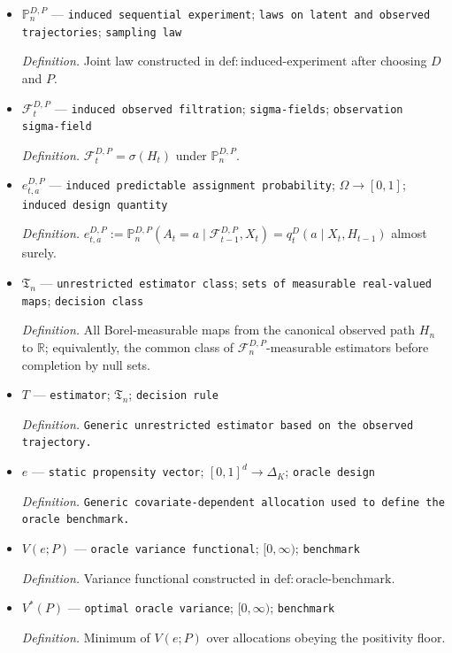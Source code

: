 \documentclass{article}
\begin{document}
\begin{itemize}
  \item \(\mathbb P_n^{D,P}\) --- \texttt{induced sequential experiment}; \texttt{laws on latent and observed trajectories}; \texttt{sampling law}
  \par\smallskip\noindent\emph{Definition.} Joint law constructed in \(\mathrm{def{:}induced\text{-}experiment}\) after choosing \(D\) and \(P\).
  \item \(\mathcal F_t^{D,P}\) --- \texttt{induced observed filtration}; \texttt{sigma-\allowbreak{}fields}; \texttt{observation sigma-\allowbreak{}field}
  \par\smallskip\noindent\emph{Definition.} \(\mathcal F_t^{D,P}=\sigma(H_t)\) under \(\mathbb P_n^{D,P}\).
  \item \(e_{t,a}^{D,P}\) --- \texttt{induced predictable assignment probability}; \(\Omega\to[0,1]\); \texttt{induced design quantity}
  \par\smallskip\noindent\emph{Definition.} \(e_{t,a}^{D,P}:=\mathbb P_n^{D,P}(A_t=a\mid\mathcal F_{t-1}^{D,P},X_t)=q_t^D(a\mid X_t,H_{t-1})\) almost surely.
  \item \(\mathfrak T_n\) --- \texttt{unrestricted estimator class}; \texttt{sets of measurable real-\allowbreak{}valued maps}; \texttt{decision class}
  \par\smallskip\noindent\emph{Definition.} All Borel-measurable maps from the canonical observed path \(H_n\) to \(\mathbb R\); equivalently, the common class of \(\mathcal F_n^{D,P}\)-measurable estimators before completion by null sets.
  \item \(T\) --- \texttt{estimator}; \(\mathfrak T_n\); \texttt{decision rule}
  \par\smallskip\noindent\emph{Definition.} \texttt{Generic unrestricted estimator based on the observed trajectory.}
  \item \(e\) --- \texttt{static propensity vector}; \([0,1]^d\to\Delta_K\); \texttt{oracle design}
  \par\smallskip\noindent\emph{Definition.} \texttt{Generic covariate-\allowbreak{}dependent allocation used to define the oracle benchmark.}
  \item \(V(e;P)\) --- \texttt{oracle variance functional}; \([0,\infty)\); \texttt{benchmark}
  \par\smallskip\noindent\emph{Definition.} Variance functional constructed in \(\mathrm{def{:}oracle\text{-}benchmark}\).
  \item \(V^*(P)\) --- \texttt{optimal oracle variance}; \([0,\infty)\); \texttt{benchmark}
  \par\smallskip\noindent\emph{Definition.} Minimum of \(V(e;P)\) over allocations obeying the positivity floor.

\end{itemize}
\end{document}
